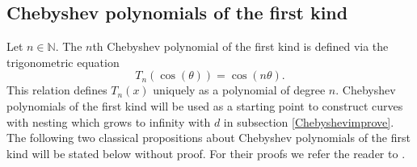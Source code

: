 \documentclass [11pt]{amsart}
\newtheorem {theorem}{Theorem}
\theoremstyle{remark}
\numberwithin{equation}{section}
\numberwithin{theorem}{section}
\begin{document}

\subsection{Chebyshev polynomials of the first kind} \label{subsectionChebyshev}
Let $n\in \mathbb{N}$. The $n$th Chebyshev polynomial of the first kind is defined via the trigonometric equation 
\[ T_{n}(\cos(\theta))= \cos(n\theta). \] 
\noindent This relation defines $T_{n}(x)$ uniquely as a polynomial of degree $n$. Chebyshev polynomials of the first kind will be used as a starting point to construct curves with nesting which grows to infinity with $d$ in subsection \ref{Chebyshevimprove}. The following two classical propositions about Chebyshev polynomials of the first kind will be stated below without proof. For their proofs we refer the reader to \cite{MH}. 
\end{document}

